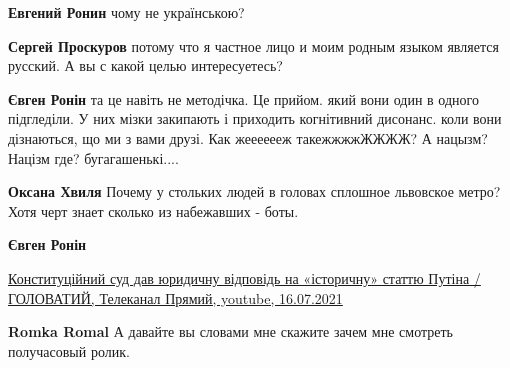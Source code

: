 \begin{itemize}
\begin{itemize}
\textbf{Евгений Ронин} чому не українською?

 
\textbf{Сергей Проскуров} потому что я частное лицо и моим родным языком является русский. А вы с какой целью интересуетесь?

 
\textbf{Євген Ронін} та це навіть не методічка. Це прийом. який вони один в одного підгледіли. У них мізки закипають і приходить когнітивний дисонанс. коли вони дізнаються, що ми з вами друзі. Как жееееееж такежжжжЖЖЖЖ? А нацызм? Націзм где? бугагашенькі....

 
\textbf{Оксана Хвиля} Почему у стольких людей в головах сплошное львовское метро? Хотя черт знает сколько из набежавших - боты.

 
\textbf{Євген Ронін}

\href{https://www.youtube.com/watch?v=vvL0XGUc5qA}{%
Конституційний суд дав юридичну відповідь на «історичну» статтю Путіна / ГОЛОВАТИЙ, %
Телеканал Прямий, %
youtube, 16.07.2021%
}

 
\textbf{Romka Romal} А давайте вы словами мне скажите зачем мне смотреть получасовый ролик.


\end{itemize}
\end{itemize}
